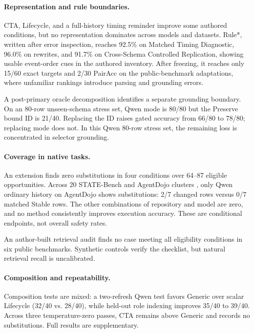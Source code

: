 \documentclass[letterpaper]{article}
\newcommand{\PrimaryDiagnostic}{Matched Timing Diagnostic}
\newcommand{\NewSchemaReplication}{Cross-Schema Controlled Replication}
\begin{document}
\paragraph{Representation and rule boundaries.}
CTA, Lifecycle, and a full-history timing reminder improve some authored conditions, but no
representation dominates across models and datasets. Rule*, written after error inspection,
reaches 92.5\% on \PrimaryDiagnostic{}, 96.0\% on rewrites, and 91.7\% on
\NewSchemaReplication{}, showing usable event-order cues in the authored inventory. After freezing,
it reaches only 15/60 exact targets and 2/30 PairAcc on the public-benchmark adaptations, where
unfamiliar rankings introduce parsing and grounding errors.

A post-primary oracle decomposition identifies a separate grounding boundary. On an 80-row
unseen-schema stress set, Qwen mode is 80/80 but the Preserve bound ID is 21/40. Replacing the ID
raises gated accuracy from 66/80 to 78/80; replacing mode does not. In this Qwen 80-row stress set,
the remaining loss is concentrated in selector grounding.

\paragraph{Coverage in native tasks.}
An extension finds zero substitutions in four conditions over 64--87 eligible opportunities.
Across 20 STATE-Bench and AgentDojo clusters
\cite{microsoft2026statebench,debenedetti2024agentdojo}, only Qwen ordinary history on AgentDojo
shows substitutions: 2/7 changed rows versus 0/7 matched Stable rows. The other combinations of
repository and model are zero, and no method consistently improves execution accuracy. These are
conditional endpoints, not overall safety rates.

An author-built retrieval audit finds no case meeting all eligibility conditions in six public
benchmarks. Synthetic controls verify the checklist, but natural retrieval recall is uncalibrated.

\paragraph{Composition and repeatability.}
Composition tests are mixed: a two-refresh Qwen test favors Generic over scalar Lifecycle (32/40
vs. 28/40), while held-out role indexing improves 35/40 to 39/40. Across three temperature-zero
passes, CTA remains above Generic and records no substitutions. Full results are supplementary.
\end{document}

